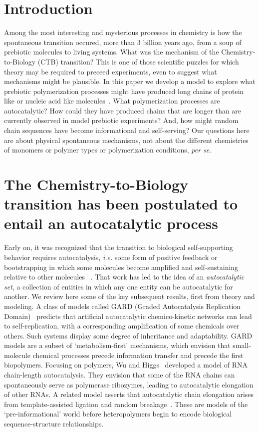 \documentclass[twocolumn,letterpaper]{revtex4}
\begin{document}
\section*{Introduction} 

 Among the most interesting and mysterious processes in chemistry is how the spontaneous 
transition 
occured, more than 3 billion years ago, from a soup of prebiotic molecules to living systems.  
What 
was the mechanism of the Chemistry-to-Biology (CTB) transition?  This is one of those scientific 
puzzles for which theory may be required to preceed experiments, even to suggest what mechanisms 
might be plausible.  In this paper we develop a model to 
explore what prebiotic polymerization processes might have produced long chains of protein like or 
nucleic acid like molecules~\cite{Joyce1987,Abel2005}.  What polymerization processes are 
autocatalytic?  How could they have produced chains that are longer than are currently observed in 
model prebiotic experiments?  And, how might random chain sequences have become informational and 
self-serving?  Our questions here are about physical spontaneous mechanisms, not about the 
different chemistries of monomers or polymer types or polymerization conditions, \emph{per se}.  
 
 \section*{The Chemistry-to-Biology transition has been postulated to entail an autocatalytic 
process}
  Early on, it was 
recognized 
that the transition to biological self-supporting behavior requires autocatalysis, \emph{i.e.} some 
form of positive feedback or 
bootstrapping in which some molecules become amplified and self-sustaining relative to other 
molecules 
~\cite{eigen1971selforganization,Eigen1977,Eigen1978,Dyson1985,Prigogine1989,Kauffman1986}.  That 
work has led to the idea of an \emph{autocatalytic set}, a collection of entities in which any one 
entity can be autocatalytic for another.  We review here some of the key subsequent results, first 
from theory and modeling.  A class of models called GARD (Graded Autocatalysis Replication 
Domain)~\cite{segre1998graded,Segre2000,Markovitch2012} predicts that artificial autocatalytic 
chemico-kinetic networks can lead to self-replication, with a corresponding amplification of some 
chemicals over others. Such systems  display some degree of 
inheritance and adaptability.  GARD models are a subset of `metabolism-first' 
mechanisms, which envision that 
small-molecule chemical processes precede information transfer and precede the first biopolymers.  
Focusing on polymers, Wu and Higgs~\cite{Wu2009} developed a model of RNA chain-length 
autocatalysis.  They envision that some of the RNA chains can spontaneously serve as polymerase 
ribozymes, leading to autocatalytic elongation of other RNAs.  A related model asserts that 
autocatalytic chain elongation arises from template-assisted ligation and random 
breakage~\cite{Tkachenko2014}.  These are models of the `pre-informational' world before 
heteropolymers begin to encode biological sequence-structure relationships.  
 
\end{document}
